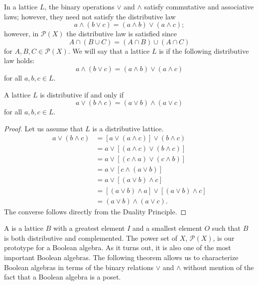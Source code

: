  
In a lattice $L$, the binary operations $\vee$ and $\wedge$ satisfy
commutative and associative laws; however, they need not satisfy the
distributive law 
\[ 
a \wedge ( b \vee c ) = (a \wedge b ) \vee ( a \wedge c );
\] 
however, in ${\mathcal P}(X)$ the distributive law is satisfied since
\[
A \cap ( B \cup C ) = (A \cap B ) \cup ( A \cap C )
\]
for $A, B, C \in {\mathcal P}(X)$. We will say that a lattice $L$ is
 if the following
distributive law holds:
\[
a \wedge ( b \vee c ) = (a \wedge b ) \vee ( a \wedge c )
\]
for all $a, b, c \in L$.
 
 
\begin{theorem}\label{boolean:dist_lattice_theorem}
A lattice $L$ is distributive if and only if 
\[
a \vee ( b \wedge c ) = ( a \vee b ) \wedge ( a \vee c )
\]
for all $a, b, c \in L$.
\end{theorem}
 
 
\begin{proof}
Let us assume that $L$ is a distributive lattice.
\begin{align*}
a \vee ( b \wedge c ) 
& = [a \vee (a \wedge c) ] \vee ( b \wedge c ) \\
& = a \vee [(a \wedge c)  \vee ( b \wedge c )] \\
& = a \vee [(c \wedge a)  \vee ( c \wedge b )] \\
& = a \vee [c \wedge ( a  \vee b )] \\
& = a \vee [( a  \vee b ) \wedge c ] \\
& = [( a  \vee b ) \wedge a ] \vee [(a \vee b) \wedge c ] \\
& = ( a \vee b ) \wedge ( a \vee c ).
\end{align*}
The converse follows directly from the Duality Principle.
\end{proof}
 
 
\medskip
 
 
A  is a
lattice $B$ with a greatest element $I$ and a smallest element $O$
such that $B$ is both distributive and complemented. The power set of
$X$, ${\mathcal P}(X)$, is our prototype for a Boolean algebra.  As it
turns out, it is also one of the most important Boolean algebras. The
following theorem allows us to characterize Boolean algebras in terms
of the binary relations $\vee$ and $\wedge$ without mention of the
fact that a Boolean algebra is a poset. 
 
